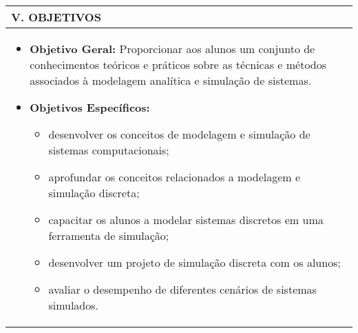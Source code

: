 \documentclass[12pt]{article}
\begin{document}
\begin{longtable}{|L{1.025\textwidth}|} \hline
%
{\bf V. OBJETIVOS } \\ \hline
%
\begin{itemize}
\item \textbf{Objetivo Geral:} Proporcionar aos alunos um conjunto de conhecimentos teóricos e
práticos sobre as técnicas e métodos associados à modelagem analítica e simulação de
sistemas.
\item \textbf{Objetivos Específicos:}
\begin{itemize}
\item desenvolver os conceitos de modelagem e simulação de sistemas computacionais;
\item aprofundar os conceitos relacionados a modelagem e simulação discreta;
\item capacitar os alunos a modelar sistemas discretos em uma ferramenta de simulação;
\item desenvolver um projeto de simulação discreta com os alunos;
\item avaliar o desempenho de diferentes cenários de sistemas simulados.
\end{itemize}
\end{itemize}
\\ \hline
\end{longtable}
\end{document}
